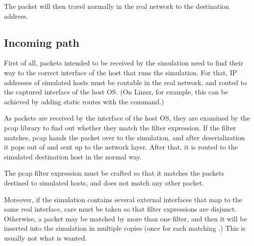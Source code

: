 The packet will then travel normally in the real network to the
destination address.

\subsection*{Incoming path}

First of all, packets intended to be received by the simulation
need to find their way to the correct  interface of the host that
runs the simulation. For that, IP addresses of simulated hosts
must be routable in the real network, and routed to the captured
interface of the host OS. (On Linux, for example, this can be achieved
by adding static routes with the  command.)

As packets are received by the interface of the host OS, they
are examined by the pcap library to find out whether they match
the filter expression. If the filter matches, pcap hands the
packet over to the simulation, and after deserialization
it pops out of  and sent up to the network
layer. After that, it is routed to the simulated destination host
in the normal way.

The pcap filter expression must be crafted so that it matches
the packets destined to simulated hosts, and does not match
any other packet.

Moreover, if the simulation contains several external interfaces
that map to the same real interface, care must be taken so that
filter expressions are disjunct. Otherwise, a packet may be
matched by more than one filter, and then it will be inserted
into the simulation in multiple copies (once for each matching
.) This is usually not what is wanted.


